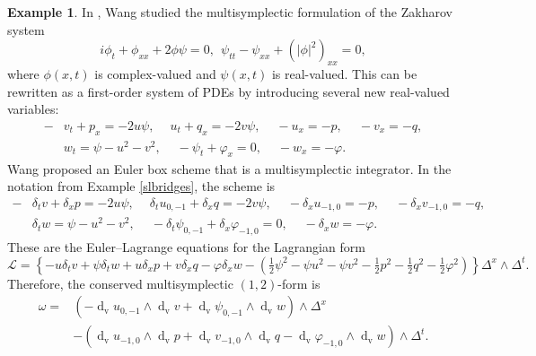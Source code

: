\documentclass[11pt]{article} %
\numberwithin{equation}{section}
\newcommand{\upd}{\operatorname{d}}
\newcommand{\upv}{\operatorname{v}}
\newcommand{\dv}{\upd_{\upv}\!}
\newcommand{\msL}{\mathscr{L}}
\theoremstyle{plain}
\theoremstyle{definition}
\newtheorem{exm}[defn]{Example}
\begin{document}
\begin{exm}
In \cite{Wa2008}, Wang studied the multisymplectic formulation of the Zakharov system
\begin{equation}
  i\phi_{t}+\phi_{xx}+2\phi\psi=0,~~\psi_{tt}-\psi_{xx}+(|\phi|^2)_{xx}=0,
\end{equation}
where $\phi(x,t)$ is complex-valued and $\psi(x,t)$ is real-valued. This can be rewritten as a first-order system of PDEs by introducing several new real-valued variables:
\begin{equation}
  \begin{aligned}
    -&v_{t}+p_{x}=-2u\psi,~\quad u_{t}+q_{x}=-2v\psi,~\quad -u_{x}=-p,~\quad -v_{x}=-q,\\
    &w_{t}=\psi-u^2-v^2,~\quad -\psi_{t}+\varphi_{x}=0,~\quad -w_{x}=-\varphi.
  \end{aligned}
\end{equation}
Wang proposed an Euler box scheme that is a multisymplectic integrator. In the notation from Example \ref{slbridges}, the scheme is
\begin{equation}\label{eulerscheme}
  \begin{aligned}
    -&\delta_t v+\delta_x p=-2u\psi,~\quad 
    \delta_t u_{0,-1}+\delta_x q=-2v\psi,~\quad -\delta_x u_{-1,0}=-p,~\quad -\delta_x v_{-1,0}=-q,\\
    &\delta_t w=\psi-u^2-v^2,~\quad 
    -\delta_t \psi_{0,-1}+\delta_x \varphi_{-1,0}=0,~\quad -\delta_x w=-\varphi.
  \end{aligned}
\end{equation}
These are the Euler--Lagrange equations for the Lagrangian form
\begin{equation}
    \msL=\left\{-u\delta_t v+\psi\delta_t w+u\delta_x p
    +v\delta_x q-\varphi\delta_x w-\left(\tfrac{1}{2}\psi^2
    -\psi u^2 -\psi v^2-\tfrac{1}{2}p^2-\tfrac{1}{2}q^2-\tfrac{1}{2}\varphi^2\right)\right\}\Delta^x\wedge\Delta^t.
\end{equation}
Therefore, the conserved multisymplectic $(1,2)$-form is
\begin{equation}
  \begin{aligned}
    \omega=&\left(-\dv u_{0,-1}\wedge\dv v
    +\dv \psi_{0,-1}\wedge\dv w\right)\wedge\Delta^x\\
    &-\left(\dv u_{-1,0}\wedge\dv p+
    \dv v_{-1,0}\wedge\dv q-
    \dv \varphi_{-1,0}\wedge\dv w\right)\wedge\Delta^t.
  \end{aligned}
\end{equation}
\end{exm}
\end{document}
